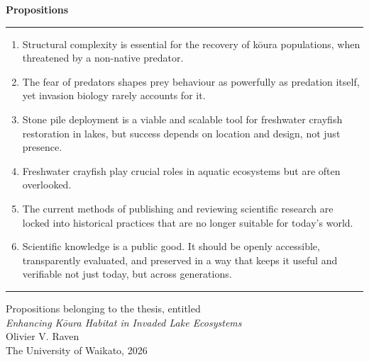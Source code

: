 \documentclass[
  12pt,
  a4paper,
  oneside]{scrbook}
\begin{document}
\clearpage
\thispagestyle{empty}
\begin{minipage}[t][0.96\textheight][s]{\textwidth}

\vspace{0.6cm}

{\fontsize{16}{20}\selectfont\sffamily\bfseries Propositions}

\vspace{0.5cm}
{\color{thesissand}\rule{\textwidth}{1.5pt}}
\vspace{0.6cm}

\begin{enumerate}[label={\bfseries\arabic*.}]
  \setlength{\itemsep}{1.2em}

  \item Structural complexity is essential for the recovery of kōura populations, when
        threatened by a non-native predator.\\
        \hspace*{1em}{\small\itshape (this thesis)}

  \item The fear of predators shapes prey behaviour as powerfully as predation
        itself, yet invasion biology rarely accounts for it.\\
        \hspace*{1em}{\small\itshape (this thesis)}

  \item Stone pile deployment is a viable and scalable tool for freshwater crayfish
        restoration in lakes, but success depends on location and design, not just presence.\\
        \hspace*{1em}{\small\itshape (this thesis)}

  \item Freshwater crayfish play crucial roles in aquatic ecosystems but are often overlooked.

  \item The current methods of publishing and reviewing scientific research are locked 
        into historical practices that are no longer suitable for today's world.

  \item Scientific knowledge is a public good. It should be openly accessible,
        transparently evaluated, and preserved in a way that keeps it useful and verifiable
        not just today, but across generations.

\end{enumerate}

\vfill

{\color{thesissand}\rule{\textwidth}{0.8pt}}
\vspace{0.4cm}

{\small\sffamily
Propositions belonging to the thesis, entitled\\[0.3em]
\textit{Enhancing Kōura Habitat in Invaded Lake Ecosystems}\\[0.3em]
Olivier V. Raven\\
The University of Waikato, 2026
}

\end{minipage}
\clearpage
\end{document}
